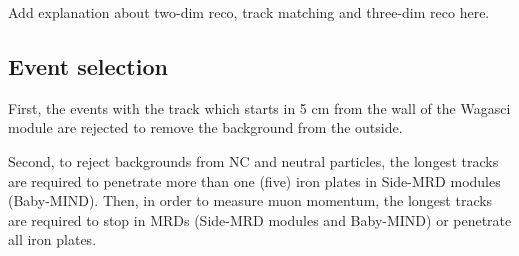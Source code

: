 Add explanation about two-dim reco, track matching and three-dim reco here.


\subsection{Event selection}

First, the events with the track which starts in 5 cm from the wall of the Wagasci module are rejected to remove the background from the outside.


Second, to reject backgrounds from NC and neutral particles, the longest tracks are required to penetrate more than one (five) iron plates in Side-MRD modules (Baby-MIND). 
Then, in order to measure muon momentum, the longest tracks are required to stop in MRDs (Side-MRD modules and Baby-MIND) or penetrate all iron plates.


